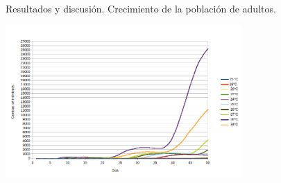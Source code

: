 \begin{frame}[t]{Resultados y discusión. Crecimiento de la población de adultos.}
\begin{center}
    \includegraphics[width=9cm]{../paper/graphics/evolucion-poblacion-adultos.png}
\end{center}
\end{frame}


